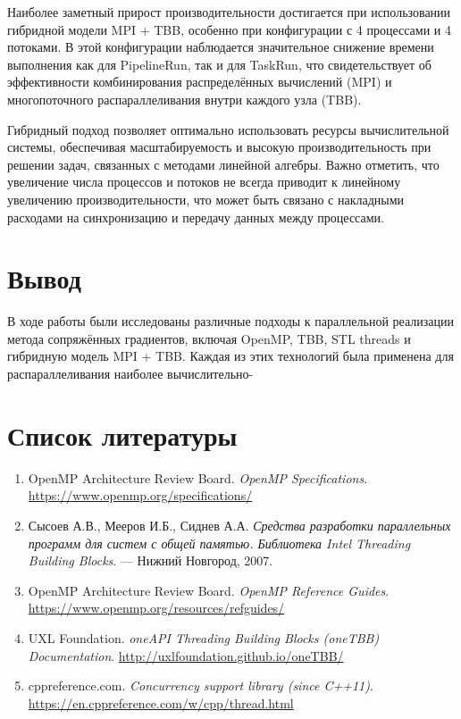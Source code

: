 \documentclass[12pt]{article}
\begin{document}
Наиболее заметный прирост производительности достигается при использовании гибридной модели MPI + TBB, особенно при конфигурации с 4 процессами и 4 потоками. В этой конфигурации наблюдается значительное снижение времени выполнения как для PipelineRun, так и для TaskRun, что свидетельствует об эффективности комбинирования распределённых вычислений (MPI) и многопоточного распараллеливания внутри каждого узла (TBB). 

Гибридный подход позволяет оптимально использовать ресурсы вычислительной системы, обеспечивая масштабируемость и высокую производительность при решении задач, связанных с методами линейной алгебры. Важно отметить, что увеличение числа процессов и потоков не всегда приводит к линейному увеличению производительности, что может быть связано с накладными расходами на синхронизацию и передачу данных между процессами.

\section{Вывод}
\hspace*{1.35em}В ходе работы были исследованы различные подходы к параллельной реализации метода сопряжённых градиентов, включая OpenMP, TBB, STL threads и гибридную модель MPI + TBB. Каждая из этих технологий была применена для распараллеливания наиболее вычислительно-

\section{Список литературы}

\begin{enumerate}
    \item OpenMP Architecture Review Board. \textit{OpenMP Specifications}. \url{https://www.openmp.org/specifications/}
    \item Сысоев А.В., Мееров И.Б., Сиднев А.А. \textit{Средства разработки параллельных программ для систем с общей памятью. Библиотека Intel Threading Building Blocks}. — Нижний Новгород, 2007.
    \item OpenMP Architecture Review Board. \textit{OpenMP Reference Guides}. \url{https://www.openmp.org/resources/refguides/}
    \item UXL Foundation. \textit{oneAPI Threading Building Blocks (oneTBB) Documentation}. \url{http://uxlfoundation.github.io/oneTBB/}
    \item cppreference.com. \textit{Concurrency support library (since C++11)}. \url{https://en.cppreference.com/w/cpp/thread.html}
\end{enumerate}
\newpage
\end{document}
